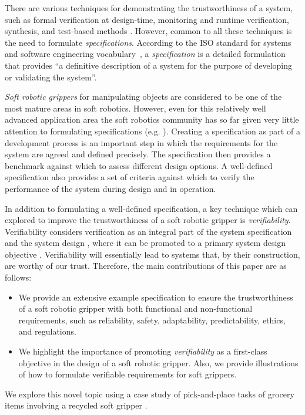 \documentclass[letterpaper, 10 pt, conference]{ieeeconf}  %
\begin{document}
	There are various techniques for demonstrating the trustworthiness of a system, such as formal verification at design-time, monitoring and runtime verification, synthesis, and test-based methods \cite{Abeywickrama2022}. 
	However, common to all these techniques is the need to formulate \emph{specifications}. According to the ISO standard for systems and software engineering vocabulary~\cite{ISO24765:2017}, a \emph{specification} is a detailed formulation that provides ``a definitive description of a system for the purpose of developing or validating the system''. 
	
	\emph{Soft robotic grippers} for manipulating objects are considered to be one of the most mature areas in soft robotics. 
	However, even for this relatively well advanced application area the soft robotics community has so far given very little attention to formulating specifications (e.g. \cite{Shi2023,Cheng2021,Liu2021,Chen2018,Cai2021,Hwang2020,Shin2021}).  Creating a specification as part of a development process is an important step in which the requirements for the system are agreed and defined precisely. %
	The specification then provides a benchmark against which to assess different design options. A well-defined specification also provides a set of criteria against which to verify the performance of the system during design and in operation.
	
	In addition to formulating a well-defined specification, a key technique which can explored to improve the trustworthiness of a soft robotic gripper is \emph{verifiability}. %
	Verifiability considers verification as an integral part of the system specification and the system design \cite{Mousavi2022}, where it can be promoted to a primary system design objective \cite{Eder2021}. 
	Verifiability will essentially lead to systems that, by their construction, are worthy of our trust. 
	Therefore, the main contributions of this paper are as follows:
	\begin{itemize}
		\item We provide an extensive example specification to ensure the trustworthiness of a soft robotic gripper \cite{Partridge2022} with both functional and non-functional requirements, such as reliability, safety, adaptability, predictability, ethics, and regulations.
		\item We highlight the importance of promoting \emph{verifiability} as a first-class objective in the design of a soft robotic gripper. Also, we provide illustrations of how to formulate verifiable requirements for soft grippers.
	\end{itemize}
	We explore this novel topic using a case study of pick-and-place tasks of grocery items \cite{Triantafyllou2019, Sotiropoulos2018} involving a recycled soft gripper \cite{Partridge2022}. 
	
\end{document}
